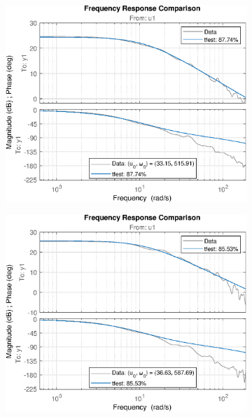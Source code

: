 \begin{figure}[H]
    \begin{minipage}{0.32\textwidth}
       \begin{figure}[H]
            \includegraphics[width = \textwidth]{./figs/small_perturbation/freq_Compare_1400.eps}
       \end{figure}
    \end{minipage}
    \begin{minipage}{0.32\textwidth}
       \begin{figure}[H]
            \includegraphics[width = \textwidth]{./figs/small_perturbation/freq_Compare_1450.eps}

\end{figure}
\end{minipage}
\end{figure}
